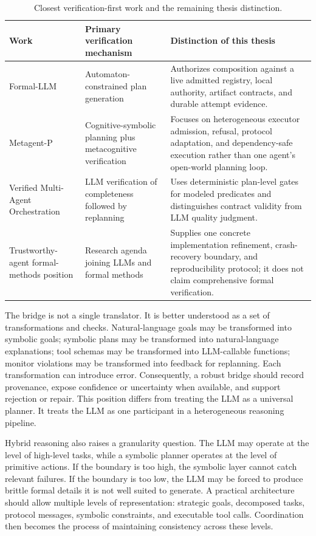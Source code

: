 \begin{table}[htbp]
\centering
\caption{Closest verification-first work and the remaining thesis distinction.}
\label{tab:closest-verification-work}
\small
\begin{tabular}{p{}p{}p{}}
\toprule
\textbf{Work} & \textbf{Primary verification mechanism} & \textbf{Distinction of this thesis} \\
\midrule
Formal-LLM & Automaton-constrained plan generation & Authorizes composition against a live admitted registry, local authority, artifact contracts, and durable attempt evidence. \\
Metagent-P & Cognitive-symbolic planning plus metacognitive verification & Focuses on heterogeneous executor admission, refusal, protocol adaptation, and dependency-safe execution rather than one agent's open-world planning loop. \\
Verified Multi-Agent Orchestration & LLM verification of completeness followed by replanning & Uses deterministic plan-level gates for modeled predicates and distinguishes contract validity from LLM quality judgment. \\
Trustworthy-agent formal-methods position & Research agenda joining LLMs and formal methods & Supplies one concrete implementation refinement, crash-recovery boundary, and reproducibility protocol; it does not claim comprehensive formal verification. \\
\bottomrule
\end{tabular}
\end{table}

The bridge is not a single translator. It is better understood as a set of transformations and checks. Natural-language goals may be transformed into symbolic goals; symbolic plans may be transformed into natural-language explanations; tool schemas may be transformed into LLM-callable functions; monitor violations may be transformed into feedback for replanning. Each transformation can introduce error. Consequently, a robust bridge should record provenance, expose confidence or uncertainty when available, and support rejection or repair. This position differs from treating the LLM as a universal planner. It treats the LLM as one participant in a heterogeneous reasoning pipeline.

Hybrid reasoning also raises a granularity question. The LLM may operate at the level of high-level tasks, while a symbolic planner operates at the level of primitive actions. If the boundary is too high, the symbolic layer cannot catch relevant failures. If the boundary is too low, the LLM may be forced to produce brittle formal details it is not well suited to generate. A practical architecture should allow multiple levels of representation: strategic goals, decomposed tasks, protocol messages, symbolic constraints, and executable tool calls. Coordination then becomes the process of maintaining consistency across these levels.


